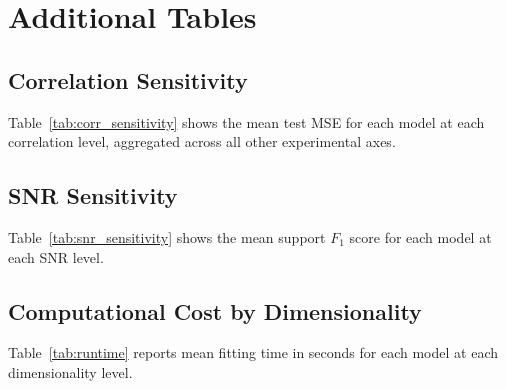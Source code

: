 \section{Additional Tables}
\label{sec:appendix}

\subsection{Correlation Sensitivity}

Table~\ref{tab:corr_sensitivity} shows the mean test MSE for each model at each correlation level, aggregated across all other experimental axes.

\begin{table}[ht]
\centering
\caption{Mean test MSE by model and correlation strength $\rho$. Best value per column in bold.}
\label{tab:corr_sensitivity}

\end{table}

\subsection{SNR Sensitivity}

Table~\ref{tab:snr_sensitivity} shows the mean support $F_1$ score for each model at each SNR level.

\begin{table}[ht]
\centering
\caption{Mean support $F_1$ by model and SNR. Best value per column in bold.}
\label{tab:snr_sensitivity}

\end{table}

\subsection{Computational Cost by Dimensionality}

Table~\ref{tab:runtime} reports mean fitting time in seconds for each model at each dimensionality level.

\begin{table}[ht]
\centering
\caption{Mean fitting time (seconds) by model and dimensionality $p$.}
\label{tab:runtime}

\end{table}
